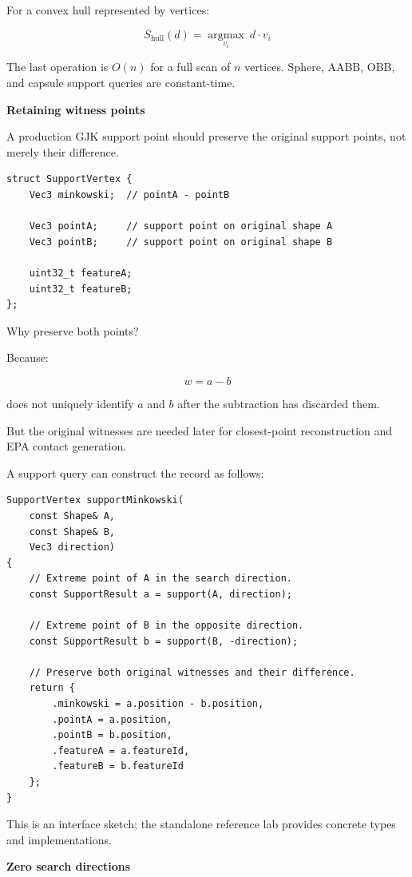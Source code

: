 For a convex hull represented by vertices:

\[
S_{\mathrm{hull}}(d)= \underset{v_i}{\operatorname{argmax}}\ d\cdot v_i
\]

The last operation is \(O(n)\) for a full scan of \(n\) vertices. Sphere, AABB, OBB, and capsule support queries are constant-time.

\textbf{Retaining witness points}

A production GJK support point should preserve the original support points, not merely their difference.

\begin{verbatim}
struct SupportVertex {
    Vec3 minkowski;  // pointA - pointB

    Vec3 pointA;     // support point on original shape A
    Vec3 pointB;     // support point on original shape B

    uint32_t featureA;
    uint32_t featureB;
};
\end{verbatim}

Why preserve both points?

Because:

\[
w=a-b
\]

does not uniquely identify \(a\) and \(b\) after the subtraction has discarded them.

But the original witnesses are needed later for closest-point reconstruction and EPA contact generation.

A support query can construct the record as follows:

\begin{verbatim}
SupportVertex supportMinkowski(
    const Shape& A,
    const Shape& B,
    Vec3 direction)
{
    // Extreme point of A in the search direction.
    const SupportResult a = support(A, direction);

    // Extreme point of B in the opposite direction.
    const SupportResult b = support(B, -direction);

    // Preserve both original witnesses and their difference.
    return {
        .minkowski = a.position - b.position,
        .pointA = a.position,
        .pointB = b.position,
        .featureA = a.featureId,
        .featureB = b.featureId
    };
}
\end{verbatim}

This is an interface sketch; the standalone reference lab provides concrete types and implementations.

\textbf{Zero search directions}

